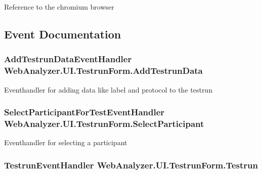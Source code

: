 Reference to the chromium browser 



\subsection{Event Documentation}
\hypertarget{class_web_analyzer_1_1_u_i_1_1_testrun_form_a29bd18b6bcaf8b884378062e278b99b1}{}
\subsubsection[{Add\+Testrun\+Data}]{\setlength{\rightskip}{0pt plus 5cm}Add\+Testrun\+Data\+Event\+Handler Web\+Analyzer.\+U\+I.\+Testrun\+Form.\+Add\+Testrun\+Data}\label{class_web_analyzer_1_1_u_i_1_1_testrun_form_a29bd18b6bcaf8b884378062e278b99b1}


Eventhandler for adding data like label and protocol to the testrun 

\hypertarget{class_web_analyzer_1_1_u_i_1_1_testrun_form_a18eca3a8ed7f598778799921d9564428}{}
\subsubsection[{Select\+Participant}]{\setlength{\rightskip}{0pt plus 5cm}Select\+Participant\+For\+Test\+Event\+Handler Web\+Analyzer.\+U\+I.\+Testrun\+Form.\+Select\+Participant}\label{class_web_analyzer_1_1_u_i_1_1_testrun_form_a18eca3a8ed7f598778799921d9564428}


Eventhandler for selecting a participant 

\hypertarget{class_web_analyzer_1_1_u_i_1_1_testrun_form_ac07b8e3d6b66e219b067dcacd1535f2c}{}
\subsubsection[{Testrun}]{\setlength{\rightskip}{0pt plus 5cm}Testrun\+Event\+Handler Web\+Analyzer.\+U\+I.\+Testrun\+Form.\+Testrun}\label{class_web_analyzer_1_1_u_i_1_1_testrun_form_ac07b8e3d6b66e219b067dcacd1535f2c}


